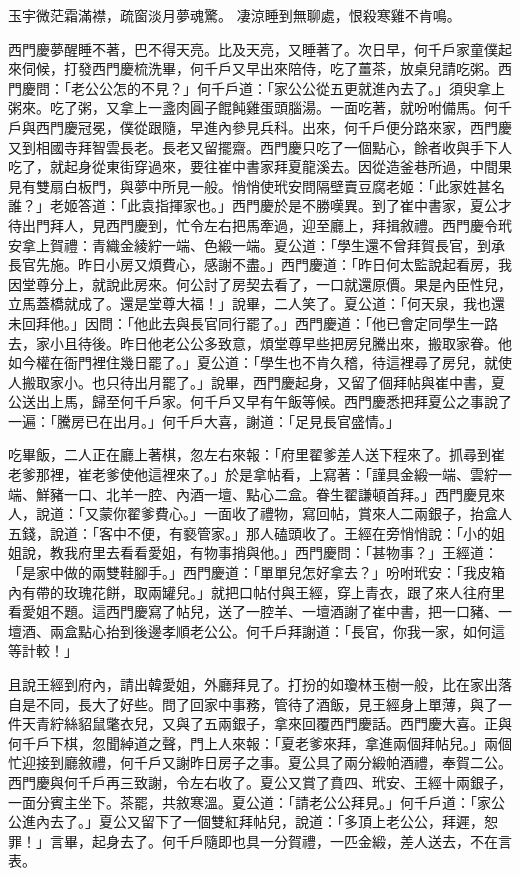 玉宇微茫霜滿襟，疏窗淡月夢魂驚。
凄涼睡到無聊處，恨殺寒雞不肯鳴。

西門慶夢醒睡不著，巴不得天亮。比及天亮，又睡著了。次日早，何千戶家童僕起來伺候，打發西門慶梳洗畢，何千戶又早出來陪侍，吃了薑茶，放桌兒請吃粥。西門慶問：「老公公怎的不見？」何千戶道：「家公公從五更就進內去了。」須臾拿上粥來。吃了粥，又拿上一盞肉圓子餛飩雞蛋頭腦湯。一面吃著，就吩咐備馬。何千戶與西門慶冠冕，僕從跟隨，早進內參見兵科。出來，何千戶便分路來家，西門慶又到相國寺拜智雲長老。長老又留擺齋。西門慶只吃了一個點心，餘者收與手下人吃了，就起身從東街穿過來，要往崔中書家拜夏龍溪去。因從造釜巷所過，中間果見有雙扇白板門，與夢中所見一般。悄悄使玳安問隔壁賣豆腐老姬：「此家姓甚名誰？」老姬答道：「此袁指揮家也。」西門慶於是不勝嘆異。到了崔中書家，夏公才待出門拜人，見西門慶到，忙令左右把馬牽過，迎至廳上，拜揖敘禮。西門慶令玳安拿上賀禮：青織金綾紵一端、色緞一端。夏公道：「學生還不曾拜賀長官，到承長官先施。昨日小房又煩費心，感謝不盡。」西門慶道：「昨日何太監說起看房，我因堂尊分上，就說此房來。何公討了房契去看了，一口就還原價。果是內臣性兒，立馬蓋橋就成了。還是堂尊大福！」說畢，二人笑了。夏公道：「何天泉，我也還未回拜他。」因問：「他此去與長官同行罷了。」西門慶道：「他已會定同學生一路去，家小且待後。昨日他老公公多致意，煩堂尊早些把房兒騰出來，搬取家眷。他如今權在衙門裡住幾日罷了。」夏公道：「學生也不肯久稽，待這裡尋了房兒，就使人搬取家小。也只待出月罷了。」說畢，西門慶起身，又留了個拜帖與崔中書，夏公送出上馬，歸至何千戶家。何千戶又早有午飯等候。西門慶悉把拜夏公之事說了一遍：「騰房已在出月。」何千戶大喜，謝道：「足見長官盛情。」

吃畢飯，二人正在廳上著棋，忽左右來報：「府里翟爹差人送下程來了。抓尋到崔老爹那裡，崔老爹使他這裡來了。」於是拿帖看，上寫著：「謹具金緞一端、雲紵一端、鮮豬一口、北羊一腔、內酒一壇、點心二盒。眷生翟謙頓首拜。」西門慶見來人，說道：「又蒙你翟爹費心。」一面收了禮物，寫回帖，賞來人二兩銀子，抬盒人五錢，說道：「客中不便，有褻管家。」那人磕頭收了。王經在旁悄悄說：「小的姐姐說，教我府里去看看愛姐，有物事捎與他。」西門慶問：「甚物事？」王經道：「是家中做的兩雙鞋腳手。」西門慶道：「單單兒怎好拿去？」吩咐玳安：「我皮箱內有帶的玫瑰花餅，取兩罐兒。」就把口帖付與王經，穿上青衣，跟了來人往府里看愛姐不題。這西門慶寫了帖兒，送了一腔羊、一壇酒謝了崔中書，把一口豬、一壇酒、兩盒點心抬到後邊孝順老公公。何千戶拜謝道：「長官，你我一家，如何這等計較！」

且說王經到府內，請出韓愛姐，外廳拜見了。打扮的如瓊林玉樹一般，比在家出落自是不同，長大了好些。問了回家中事務，管待了酒飯，見王經身上單薄，與了一件天青紵絲貂鼠氅衣兒，又與了五兩銀子，拿來回覆西門慶話。西門慶大喜。正與何千戶下棋，忽聞綽道之聲，門上人來報：「夏老爹來拜，拿進兩個拜帖兒。」兩個忙迎接到廳敘禮，何千戶又謝昨日房子之事。夏公具了兩分緞帕酒禮，奉賀二公。西門慶與何千戶再三致謝，令左右收了。夏公又賞了賁四、玳安、王經十兩銀子，一面分賓主坐下。茶罷，共敘寒溫。夏公道：「請老公公拜見。」何千戶道：「家公公進內去了。」夏公又留下了一個雙紅拜帖兒，說道：「多頂上老公公，拜遲，恕罪！」言畢，起身去了。何千戶隨即也具一分賀禮，一匹金緞，差人送去，不在言表。

